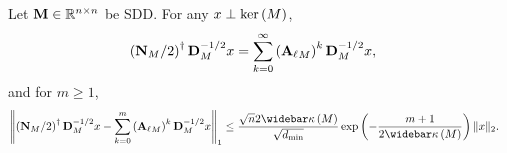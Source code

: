 \begin{lemma}\label{lemma:powerseries} Let $\mathbf{M} \in \mathbb{R}^{n \times n}$ be SDD. For any $x \perp \mathrm{ker}\left(M\right)$, 
\begin{align*}
    \left(\mathbf{N}_{M}/2\right)^\dagger {\mathbf{D}}_{M}^{-1/2} x &= \sum_{k=0}^\infty \left({\mathbf{A}_\ell}_{M} \right)^k {\mathbf{D}}_{M}^{-1/2} x,
\end{align*}
and for $m \geq 1$, 
\begin{align*}
        \left\Vert \left(\normalized{M}/2\right)^\dagger \diagonal{M}^{-1/2}x - \sum_{k=0}^{m} \left( \adjacencylazy{M} \right)^k  \diagonal{M}^{-1/2}x \right\Vert_1 &\leq \frac{\sqrt{n} 2\pcondOf{M}}{\sqrt{\dmin}} \exp\left(- \frac{m+1}{2\pcondOf{M}}\right) \norm{x}_2.
\end{align*}


\end{lemma}
